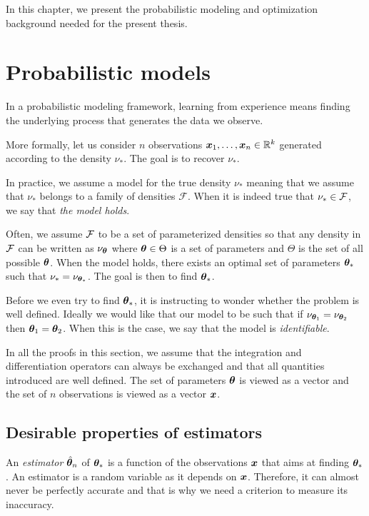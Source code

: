 In this chapter, we present the probabilistic modeling and
optimization background needed for the present thesis.

\section{Probabilistic models}
In a probabilistic modeling framework, learning from experience means finding the underlying process that generates the data we observe.

More formally, let us consider $n$ observations $\boldsymbol{x}_1, \dots, \boldsymbol{x}_n \in \mathbb{R}^k$ generated according to the density $\nu_*$.  The goal is to recover $\nu_*$.

In practice, we assume a model for the true density $\nu_*$ meaning that we
assume that $\nu_*$ belongs to a family of densities $\mathcal{F}$.
When it is indeed true that $\nu_* \in \mathcal{F}$, we say that \emph{the model holds}.

Often, we assume $\mathcal{F}$ to be a set of parameterized densities so
that any density in $\mathcal{F}$ can be written as $\nu_{\boldsymbol{\theta}}$ where
$\boldsymbol{\theta} \in \Theta$ is a set of parameters and $\Theta$ is the set of all
possible $\boldsymbol{\theta}$. When the model holds, there exists an optimal
set of parameters $\boldsymbol{\theta}_*$ such that $\nu_* = \nu_{\boldsymbol{\theta}_*}$. The goal is then
to find $\boldsymbol{\theta}_*$.


Before we even try to find $\boldsymbol{\theta}_*$, it is instructing to wonder whether the
problem is well defined. Ideally we would like that our model to be such that if
$\nu_{\boldsymbol{\theta}_1} = \nu_{\boldsymbol{\theta}_2}$ then $\boldsymbol{\theta}_1=\boldsymbol{\theta}_2$.
When this is the case, we say that the model is \emph{identifiable}.

In all the proofs in this section, we assume that the integration and
differentiation operators can always be exchanged and that all quantities
introduced are well defined. The set of parameters $\boldsymbol{\theta}$ is viewed as a
vector and the set of $n$ observations is viewed as a vector $\boldsymbol{x}$.

\subsection{Desirable properties of estimators}
An \emph{estimator} $\hat{\boldsymbol{\theta}}_n$ of $\boldsymbol{\theta}_*$ is a function of the
observations $\boldsymbol{x}$ that aims at finding $\boldsymbol{\theta}_*$.
An estimator is a random variable as it depends on $\boldsymbol{x}$. Therefore, it can almost never be perfectly accurate and that
is why we need a criterion to measure its inaccuracy.

